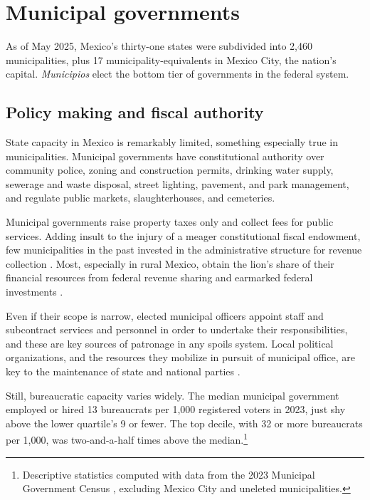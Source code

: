 \documentclass[letter,12pt]{article}
\begin{document}
\section{Municipal governments}

As of May 2025, Mexico's thirty-one states were subdivided into 2,460 municipalities, plus 17 municipality-equivalents in Mexico City, the nation's capital. \emph{Municipios} elect the bottom tier of governments in the federal system.

\subsection{Policy making and fiscal authority}

State capacity in Mexico is remarkably limited, something especially true in municipalities. Municipal governments have constitutional authority over community police, zoning and construction permits, drinking water supply, sewerage and waste disposal, street lighting, pavement, and park management, and regulate public markets, slaughterhouses, and cemeteries.

Municipal governments raise property taxes only and collect fees for public services. Adding insult to the injury of a meager constitutional fiscal endowment, few municipalities in the past invested in the administrative structure for revenue collection \citep{garfias.state.cap.2018}. Most, especially in rural Mexico, obtain the lion's share of their financial resources from federal revenue sharing and earmarked federal investments \citep{diaz.cayeros.2006, figueroa-mansur-itam.2024}.

Even if their scope is narrow, elected municipal officers appoint staff and subcontract services and personnel in order to undertake their responsibilities, and these are key sources of patronage in any spoils system. Local political organizations, and the resources they mobilize in pursuit of municipal office, are key to the maintenance of state and national parties \citep{coppedge.MxVen.1993, key.1964, rosas.lucardi.Brokers.2019}.

Still, bureaucratic capacity varies widely. The median municipal government employed or hired 13 bureaucrats per 1,000 registered voters in 2023, just shy above the lower quartile's 9 or fewer. The top decile, with 32 or more bureaucrats per 1,000, was two-and-a-half times above the median.\footnote{Descriptive statistics computed with data from the 2023 Municipal Government Census \citep{inegi.CensoGobMun2023}, excluding Mexico City and uneleted municipalities.}
\end{document}
